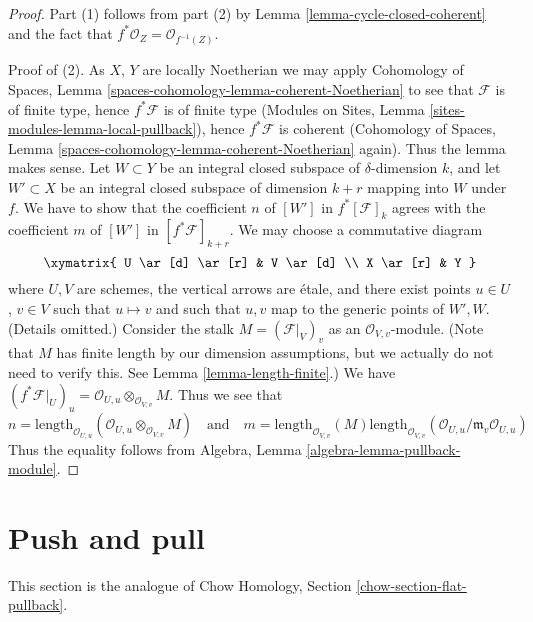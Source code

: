 \begin{proof}
Part (1) follows from part (2) by Lemma \ref{lemma-cycle-closed-coherent}
and the fact that $f^*\mathcal{O}_Z = \mathcal{O}_{f^{-1}(Z)}$.

\medskip\noindent
Proof of (2).
As $X$, $Y$ are locally Noetherian we may apply
Cohomology of Spaces, Lemma \ref{spaces-cohomology-lemma-coherent-Noetherian}
to see
that $\mathcal{F}$ is of finite type, hence $f^*\mathcal{F}$ is
of finite type (Modules on Sites, Lemma
\ref{sites-modules-lemma-local-pullback}),
hence $f^*\mathcal{F}$ is coherent
(Cohomology of Spaces, Lemma \ref{spaces-cohomology-lemma-coherent-Noetherian}
again).
Thus the lemma makes sense. Let $W \subset Y$ be an integral closed
subspace of $\delta$-dimension $k$, and let $W' \subset X$ be
an integral closed subspace of dimension $k + r$ mapping into $W$
under $f$. We have to show that the coefficient $n$ of
$[W']$ in $f^*[{\mathcal F}]_k$ agrees with the coefficient
$m$ of $[W']$ in $[f^*{\mathcal F}]_{k+r}$. We may choose
a commutative diagram
$$
\xymatrix{
U \ar[d] \ar[r] & V \ar[d] \\
X \ar[r] & Y
}
$$
where $U, V$ are schemes, the vertical arrows are \'etale, and
there exist points $u \in U$, $v \in V$ such that
$u \mapsto v$ and such that $u, v$ map to the generic
points of $W', W$. (Details omitted.)
Consider the stalk $M = (\mathcal{F}|_V)_v$ as an $\mathcal{O}_{V, v}$-module.
(Note that $M$ has finite length by our dimension assumptions, but we
actually do not need to verify this. See Lemma \ref{lemma-length-finite}.)
We have
$(f^*\mathcal{F}|_U)_u = \mathcal{O}_{U, u} \otimes_{\mathcal{O}_{V, v}} M$.
Thus we see that
$$
n = \text{length}_{\mathcal{O}_{U, u}}
(\mathcal{O}_{U, u} \otimes_{\mathcal{O}_{V, v}} M)
\quad
\text{and}
\quad
m = \text{length}_{\mathcal{O}_{V, v}}(M)
\text{length}_{\mathcal{O}_{V, v}}(
\mathcal{O}_{U, u}/\mathfrak m_v \mathcal{O}_{U, u})
$$
Thus the equality follows from
Algebra, Lemma \ref{algebra-lemma-pullback-module}.
\end{proof}









\section{Push and pull}
\label{section-push-pull}

\noindent
This section is the analogue of
Chow Homology, Section \ref{chow-section-flat-pullback}.

